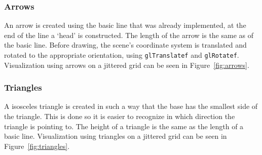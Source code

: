 		\subsubsection{Arrows}
			An arrow is created using the basic line that was already implemented, at the end of the line a `head' is constructed.
			The length of the arrow is the same as of the basic line. 
			Before drawing, the scene's coordinate system is translated and rotated to the appropriate orientation, using \texttt{glTranslatef} and \texttt{glRotatef}.
			Visualization using arrows on a jittered grid can be seen in Figure~\ref{fig:arrows}.

		\subsubsection{Triangles}
			A isosceles triangle is created in such a way that the base has the smallest side of the triangle.
			This is done so it is easier to recognize in which direction the triangle is pointing to.
			The height of a triangle is the same as the length of a basic line.
			Visualization using triangles on a jittered grid can be seen in Figure~\ref{fig:triangles}.

\clearpage